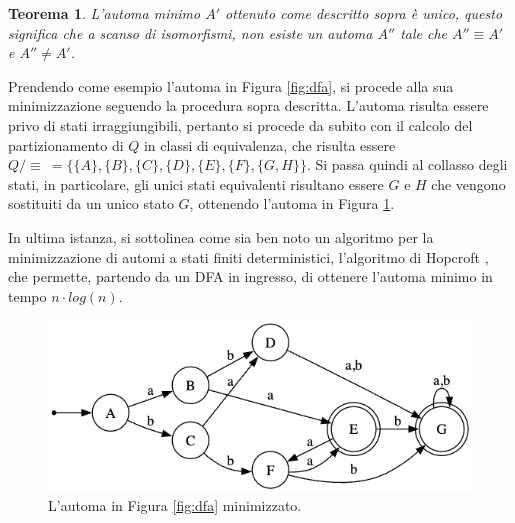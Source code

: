 \documentclass[a4paper,12pt]{report}
\newcommand{\partitioned}[2]{#1\slash\!\!#2}
\newtheorem{theorem}{Teorema}[chapter]
\begin{document}
\begin{theorem}
  \label{th:unique-min-dfa}
  L'automa minimo $A'$ ottenuto come descritto sopra è unico, questo significa che a scanso di isomorfismi,
  non esiste un automa $A''$ tale che $A'' \equiv A'$ e $A'' \neq A'$.
\end{theorem}

Prendendo come esempio l'automa in Figura \ref{fig:dfa}, si procede alla sua minimizzazione seguendo
la procedura sopra descritta. L'automa risulta essere privo di stati irraggiungibili,
pertanto si procede da subito con il calcolo del partizionamento di $Q$ in classi di equivalenza,
che risulta essere
$\partitioned{Q}{\equiv} \ = \{ \{A\}, \{B\}, \{C\}, \{D\}, \{E\}, \{F\}, \{G, H\}\}$.
Si passa quindi al collasso degli stati, in particolare, gli unici stati equivalenti risultano essere
$G$ e $H$ che vengono sostituiti da un unico stato $G$, ottenendo l'automa in Figura \ref{fig:minified-dfa}.

In ultima istanza, si sottolinea come sia ben noto un algoritmo per la minimizzazione di automi a stati finiti deterministici, 
l'algoritmo di Hopcroft \cite{Hopc71}, che permette, partendo da un DFA in ingresso, di ottenere l'automa minimo in tempo $n \cdot log(n)$.

\begin{figure}[!htb]
  \centering
  \includegraphics[width=0.7\linewidth]{minified-dfa.png}
  \caption{\label{fig:minified-dfa}L'automa in Figura \ref{fig:dfa} minimizzato.}
\end{figure}




\end{document}
